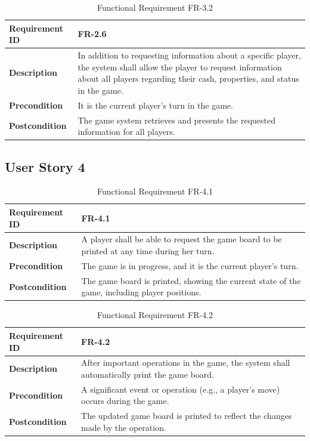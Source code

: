\documentclass{article}
\begin{document}
\begin{table}[ht]
    \centering
    \caption{Functional Requirement FR-3.2}
    \begin{tabular}{@{}P{3cm}P{12cm}@{}}
        \toprule
        \textbf{Requirement ID} & FR-2.6 \\ \midrule
        \textbf{Description} & In addition to requesting information about a specific player, the system shall allow the player to request information about all players regarding their cash, properties, and status in the game. \\ \midrule
        \textbf{Precondition} & It is the current player’s turn in the game. \\ \midrule
        \textbf{Postcondition} & The game system retrieves and presents the requested information for all players. \\ \bottomrule
    \end{tabular}
\end{table}

\clearpage
\subsection{User Story 4}

\begin{table}[ht]
    \centering
    \caption{Functional Requirement FR-4.1}
    \begin{tabular}{@{}P{3cm}P{12cm}@{}}
        \toprule
        \textbf{Requirement ID} & FR-4.1 \\ \midrule
        \textbf{Description} & A player shall be able to request the game board to be printed at any time during her turn. \\ \midrule
        \textbf{Precondition} & The game is in progress, and it is the current player's turn. \\ \midrule
        \textbf{Postcondition} & The game board is printed, showing the current state of the game, including player positions. \\ \bottomrule
    \end{tabular}
\end{table}

\begin{table}[ht]
    \centering
    \caption{Functional Requirement FR-4.2}
    \begin{tabular}{@{}P{3cm}P{12cm}@{}}
        \toprule
        \textbf{Requirement ID} & FR-4.2 \\ \midrule
        \textbf{Description} & After important operations in the game, the system shall automatically print the game board. \\ \midrule
        \textbf{Precondition} & A significant event or operation (e.g., a player’s move) occurs during the game. \\ \midrule
        \textbf{Postcondition} & The updated game board is printed to reflect the changes made by the operation. \\ \bottomrule
    \end{tabular}
\end{table}
\end{document}
